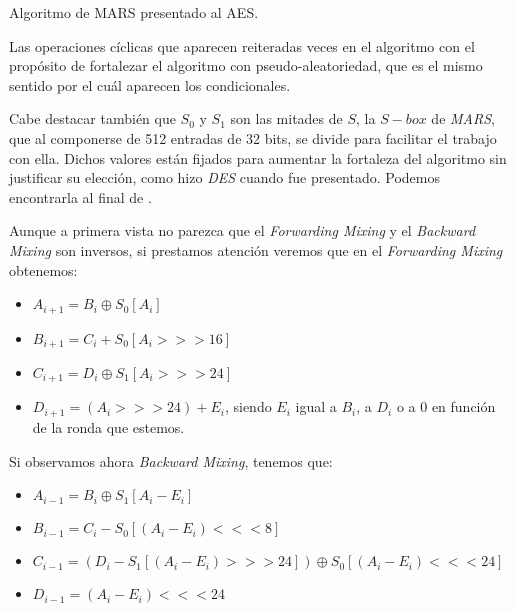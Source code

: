\begin{algorithm}[H]
\begin{algorithmic}[1]
			\ENDIF
		\ENDFOR
		
	\end{algorithmic}

	\caption{Algoritmo de MARS presentado al AES.}
	\label{alg:MARS}
\end{algorithm}

Las operaciones cíclicas que aparecen reiteradas veces en el algoritmo con el propósito de fortalezar el algoritmo con pseudo-aleatoriedad, que es el mismo sentido por el cuál aparecen los condicionales.

Cabe destacar también que $S_0$ y $S_1$ son las mitades de $S$, la $S-box$ de \textit{MARS}, que al componerse de 512 entradas de 32 bits, se divide para facilitar el trabajo con ella. Dichos valores están fijados para aumentar la fortaleza del algoritmo sin justificar su elección, como hizo \textit{DES} cuando fue presentado. Podemos encontrarla al final de \cite{MARS_Alg}.

Aunque a primera vista no parezca que el \textit{Forwarding Mixing} y el \textit{Backward Mixing} son inversos, si prestamos atención veremos que en el \textit{Forwarding Mixing} obtenemos:
\begin{itemize}
	\item $A_{i+1} = B_i \oplus S_0[A_i]$
	\item $B_{i+1} = C_i + S_0[A_i >>> 16]$
	\item $C_{i+1} = D_i \oplus S_1[A_i >>> 24]$
	\item $D_{i+1} = (A_i >>> 24) + E_i$, siendo $E_i$ igual a $B_i$, a $D_i$ o a 0 en función de la ronda que estemos.
\end{itemize}

Si observamos ahora \textit{Backward Mixing}, tenemos que:
\begin{itemize}
	\item $A_{i-1} = B_i \oplus S_1[A_i - E_i]$
	\item $B_{i-1} = C_i - S_0[(A_i - E_i) <<< 8]$
	\item $C_{i-1} = (D_i - S_1[(A_i - E_i) >>> 24]) \oplus S_0[(A_i - E_i) <<< 24]$
	\item $D_{i-1} = (A_i - E_i) <<< 24$
\end{itemize}


